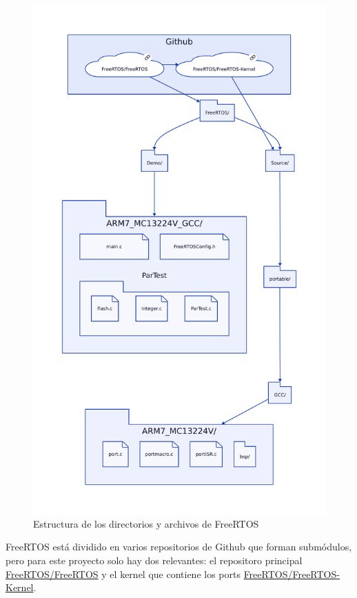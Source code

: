 \begin{figure}[h]
\centering
\includegraphics[width=\textwidth]{img/carpetasFreeRTOS.png}
\caption{Estructura de los directorios y archivos de FreeRTOS}
\label{fig:DirsFreeRTOS}
\end{figure}

FreeRTOS está dividido en varios repositorios de Github que forman submódulos, pero para este proyecto solo hay dos relevantes: el repositoro principal \href{https://github.com/FreeRTOS/FreeRTOS}{FreeRTOS/FreeRTOS} y el kernel que contiene los ports \href{https://github.com/FreeRTOS/FreeRTOS-Kernel}{FreeRTOS/FreeRTOS-Kernel}.

